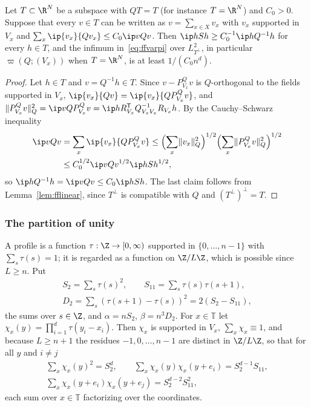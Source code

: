\begin{lemma}\label{lem:fflions}
Let $T\subset\R^N$ be a subspace with $QT=T$ (for instance $T=\R^N$) and
$C_0>0$. Suppose that every $v\in T$ can be written as $v=\sum_{x\in X}v_x$
with $v_x$ supported in $V_x$ and $\sum_x\ip{v_x}{Qv_x}\le C_0\ip v{Qv}$.
Then $\ip h{Sh}\ge C_0^{-1}\ip h{Q^{-1}h}$ for every $h\in T$, and the
infimum in~\eqref{eq:ffvarpi} over $L^2_{T^\perp}$, in particular
$\varpi(Q;(V_x))$ when $T=\R^N$, is at least $1/(C_0n^d)$.
\end{lemma}

\begin{proof}
Let $h\in T$ and $v=Q^{-1}h\in T$. Since $v-P^Q_{V_x}v$ is $Q$-orthogonal to
the fields supported in $V_x$, $\ip{v_x}{Qv}=\ip{v_x}{QP^Q_{V_x}v}$, and
$\lVert P^Q_{V_x}v\rVert_Q^2=\ip v{QP^Q_{V_x}v}=\ip h{R_{V_x}^{\mathsf T}
Q_{V_xV_x}^{-1}R_{V_x}h}$. By the Cauchy--Schwarz inequality
\begin{align*}
\ip v{Qv}&=\sum_x\ip{v_x}{QP^Q_{V_x}v}\le\Bigl(\sum_x\lVert v_x\rVert_Q^2
\Bigr)^{1/2}\Bigl(\sum_x\lVert P^Q_{V_x}v\rVert_Q^2\Bigr)^{1/2}\\
&\le C_0^{1/2}\ip v{Qv}^{1/2}\ip h{Sh}^{1/2},
\end{align*}
so $\ip h{Q^{-1}h}=\ip v{Qv}\le C_0\ip h{Sh}$. The last claim follows from
Lemma~\ref{lem:fflinear}, since $T^\perp$ is compatible with $Q$ and $(T^\perp)^\perp=T$.
\end{proof}

\subsubsection{The partition of unity}

A profile is a function $\tau:\Z\to[0,\infty)$ supported in $\{0,\dots,n-1
\}$ with $\sum_s\tau(s)=1$; it is regarded as a function on $\Z/L\Z$, which
is possible since $L\ge n$. Put
\begin{gather*}
S_2=\sum_s\tau(s)^2,\qquad S_{11}=\sum_s\tau(s)\tau(s+1),\\
D_2=\sum_s(\tau(s+1)-\tau(s))^2=2(S_2-S_{11}),
\end{gather*}
the sums over $s\in\Z$, and $\alpha=nS_2$, $\beta=n^3D_2$. For $x\in\mathbb
T$ let $\chi_x(y)=\prod_{i=1}^d\tau(y_i-x_i)$. Then $\chi_x$ is supported in
$V_x$, $\sum_x\chi_x\equiv1$, and because $L\ge n+1$ the residues $-1,0,
\dots,n-1$ are distinct in $\Z/L\Z$, so that for all $y$ and $i\ne j$
\begin{equation}\label{eq:ffchisums}
\begin{gathered}
\sum_x\chi_x(y)^2=S_2^d,\qquad\sum_x\chi_x(y)\chi_x(y+e_i)=S_2^{d-1}S_{11},\\
\sum_x\chi_x(y+e_i)\chi_x(y+e_j)=S_2^{d-2}S_{11}^2 ,
\end{gathered}
\end{equation}
each sum over $x\in\mathbb T$ factorizing over the coordinates.

